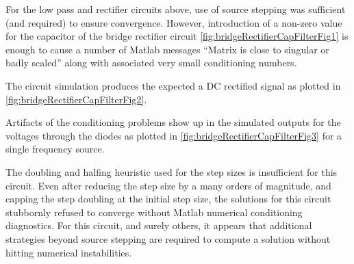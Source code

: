 For the low pass and rectifier circuits above, use of source stepping was sufficient (and required) to ensure convergence.
However, introduction of a non-zero value for the capacitor of the bridge rectifier circuit \cref{fig:bridgeRectifierCapFilterFig1} is enough to cause a number of Matlab messages ``Matrix is close to singular or badly scaled'' along with associated very small conditioning numbers.



The circuit simulation produces the expected a DC rectified signal as plotted in \cref{fig:bridgeRectifierCapFilterFig2}.


Artifacts of the conditioning problems show up in the simulated outputs for the voltages through the diodes as plotted in \cref{fig:bridgeRectifierCapFilterFig3} for a single frequency source.


The doubling and halfing heuristic used for the step sizes is insufficient for this circuit.
Even after
reducing the step size by a many orders of magnitude, and capping the step doubling at the initial step size, the solutions for this circuit stubbornly refused to converge without Matlab numerical conditioning diagnostics.
For this circuit, and surely others, it appears that additional strategies beyond source stepping are required to compute a solution without hitting numerical instabilities.

